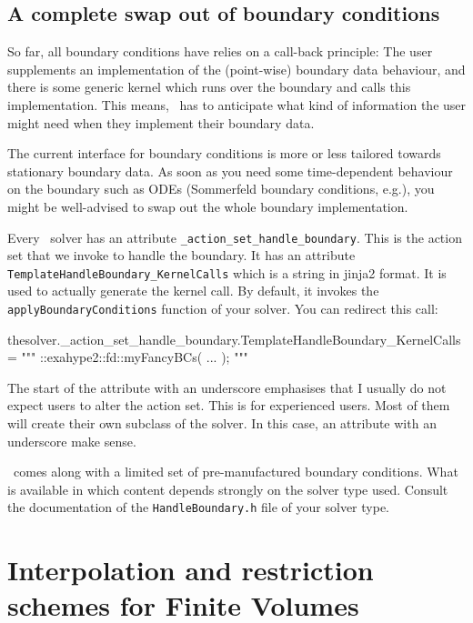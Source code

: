 \subsection{A complete swap out of boundary conditions}

So far, all boundary conditions have relies on a call-back principle: The user
supplements an implementation of the (point-wise) boundary data behaviour, and
there is some generic kernel which runs over the boundary and calls this
implementation.
This means, \ExaHyPE\ has to anticipate what kind of information the user might
need when they implement their boundary data.

\begin{remark}
 The current interface for boundary conditions is more or less tailored towards
 stationary boundary data. As soon as you need some time-dependent behaviour on
 the boundary such as ODEs (Sommerfeld boundary conditions, e.g.), you might be
 well-advised to swap out the whole boundary implementation.
\end{remark}


\noindent
Every \ExaHyPE\ solver has an attribute \texttt{\_action\_set\_handle\_boundary}.
This is the action set that we invoke to handle the boundary. 
It has an attribute \texttt{TemplateHandleBoundary\_KernelCalls} which is a
string in jinja2 format.
It is used to actually generate the kernel call.
By default, it invokes the \texttt{applyBoundaryConditions} function of your
solver. 
You can redirect this call:


\begin{code}
  thesolver._action_set_handle_boundary.TemplateHandleBoundary_KernelCalls = """
::exahype2::fd::myFancyBCs( ... );
""" 
\end{code}


\noindent
The start of the attribute with an underscore emphasises that I usually do not
expect users to alter the action set.
This is for experienced users.
Most of them will create their own subclass of the solver.
In this case, an attribute with an underscore make sense.


\ExaHyPE\ comes along with a limited set of pre-manufactured boundary
conditions. 
What is available in which content depends strongly on the solver type used.
Consult the documentation of the \texttt{HandleBoundary.h} file of your solver
type.



\section{Interpolation and restriction schemes for Finite Volumes}
\label{section:exahype:finite-volumes:interpolation-schemes}

